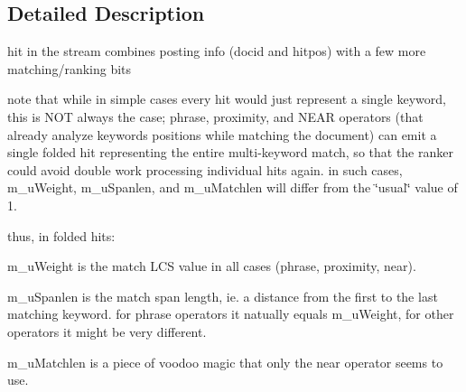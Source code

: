 \subsection{Detailed Description}
hit in the stream combines posting info (docid and hitpos) with a few more matching/ranking bits

note that while in simple cases every hit would just represent a single keyword, this is N\-O\-T always the case; phrase, proximity, and N\-E\-A\-R operators (that already analyze keywords positions while matching the document) can emit a single folded hit representing the entire multi-\/keyword match, so that the ranker could avoid double work processing individual hits again. in such cases, m\-\_\-u\-Weight, m\-\_\-u\-Spanlen, and m\-\_\-u\-Matchlen will differ from the \char`\"{}usual\char`\"{} value of 1.

thus, in folded hits\-:
\begin{DoxyItemize}
\item m\-\_\-u\-Weight is the match L\-C\-S value in all cases (phrase, proximity, near).
\item m\-\_\-u\-Spanlen is the match span length, ie. a distance from the first to the last matching keyword. for phrase operators it natually equals m\-\_\-u\-Weight, for other operators it might be very different.
\item m\-\_\-u\-Matchlen is a piece of voodoo magic that only the near operator seems to use. 
\end{DoxyItemize}

